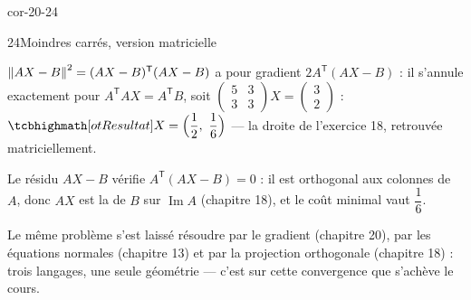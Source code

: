 \begin{blocLivre}{cor-20-24}
\begin{corrige}{24}{Moindres carrés, version matricielle}
\begin{questions}
  \item $\left\lVert AX-B\right\rVert^{2}=(AX-B)^{\mathsf T}(AX-B)$ a pour gradient
    $2A^{\mathsf T}(AX-B)$ : il s'annule exactement pour
    $A^{\mathsf T}AX=A^{\mathsf T}B$, soit
    $\begin{pmatrix}5&3\\3&3\end{pmatrix}X
    =\begin{pmatrix}3\\2\end{pmatrix}$ :
    $\res{X=\Bigl(\dfrac12,\ \dfrac16\Bigr)}$ — la droite de
    l'exercice 18, retrouvée matriciellement.
  \item Le résidu $AX-B$ vérifie $A^{\mathsf T}(AX-B)=0$ : il est
    orthogonal aux colonnes de $A$, donc $AX$ est la
     de $B$ sur
    $\operatorname{Im}A$ (chapitre 18), et le coût minimal vaut
    $\dfrac16$.
  \item Le même problème s'est laissé résoudre par le gradient
    (chapitre 20), par les équations normales (chapitre 13) et par la
    projection orthogonale (chapitre 18) : trois langages, une seule
    géométrie — c'est sur cette convergence que s'achève le cours.
\end{questions}
\end{corrige}
\end{blocLivre}


